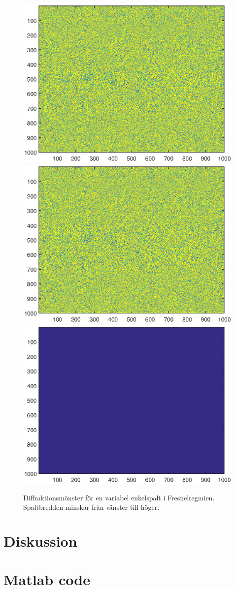 \documentclass[a4paper]{article}
\begin{document}
\FloatBarrier

\FloatBarrier

\begin{figure}[h!]
	\centering
	\includegraphics[width=0.3\linewidth]{Data/Figurer/simuleringBabinet1.eps}
	\includegraphics[width=0.3\linewidth]{Data/Figurer/simuleringBabinet2.eps}
	\includegraphics[width=0.3\linewidth]{Data/Figurer/simuleringBabinet3.eps}
	\caption{Diffraktionsmönster för en variabel enkelspalt i Fresnelregmien. Spaltbredden minskar från vänster till höger.}
	\label{fig:fresnelEnkel}
\end{figure}

\FloatBarrier

\section{Diskussion}

 
 {}
 

\appendix

\section{Matlab code}
\end{document}
